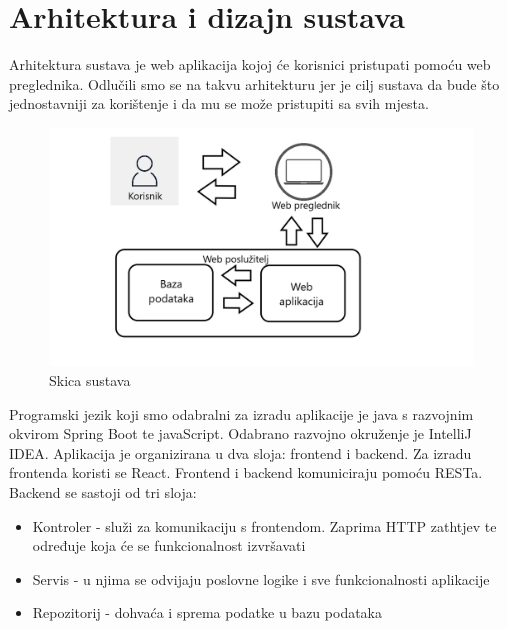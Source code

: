 \chapter{Arhitektura i dizajn sustava}
		
			Arhitektura sustava je web aplikacija kojoj će korisnici pristupati pomoću web preglednika. Odlučili smo se na takvu arhitekturu jer je cilj sustava da bude što jednostavniji za korištenje i da mu se može pristupiti sa svih mjesta.
			
			\begin{figure}[H]
				\includegraphics[scale=0.4]{slike/Skica_sustava.png} %
				\centering
				\caption{Skica sustava}
				\label{fig:sustav}
			\end{figure}
			
			Programski jezik koji smo odabralni za izradu aplikacije je java s razvojnim okvirom Spring Boot te javaScript. Odabrano razvojno okruženje je IntelliJ IDEA. 
			Aplikacija je organizirana u dva sloja: frontend i backend. Za izradu frontenda koristi se React. Frontend i backend komuniciraju pomoću RESTa. Backend se sastoji od tri sloja:
		\begin{itemize}
		\item Kontroler - služi za komunikaciju s frontendom. Zaprima HTTP zathtjev te određuje koja će se funkcionalnost izvršavati
		\item Servis - u njima se odvijaju poslovne logike i sve funkcionalnosti aplikacije
		\item Repozitorij - dohvaća i sprema podatke u bazu podataka
	\end{itemize}

